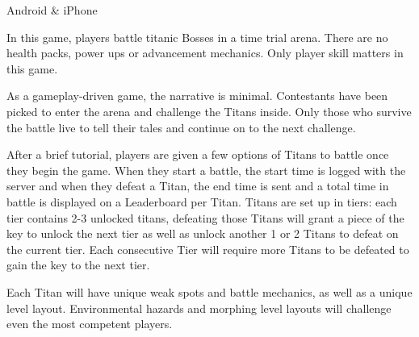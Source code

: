 \documentclass[archE1,portrait]{baposter}
\begin{document}
\begin{poster}
{ 
	Android \& iPhone
}


{
	\quad In this game, players battle titanic Bosses in a time trial arena. There are no health packs, power ups or advancement mechanics. Only player skill matters in this game.
}


{
	\quad As a gameplay-driven game, the narrative is minimal. Contestants have been picked to enter the arena and challenge the Titans inside. Only those who survive the battle live to tell their tales and continue on to the next challenge.
}


{
	\quad After a brief tutorial, players are given a few options of Titans to battle once they begin the game. When they start a battle, the start time is logged with the server and when they defeat a Titan, the end time is sent and a total time in battle is displayed on a Leaderboard per Titan. Titans are set up in tiers: each tier contains 2-3 unlocked titans, defeating those Titans will grant a piece of the key to unlock the next tier as well as unlock another 1 or 2 Titans to defeat on the current tier. Each consecutive Tier will require more Titans to be defeated to gain the key to the next tier.
	
	\quad Each Titan will have unique weak spots and battle mechanics, as well as a unique level layout. Environmental hazards and morphing level layouts will challenge even the most competent players.
	
}
\end{poster}
\end{document}
